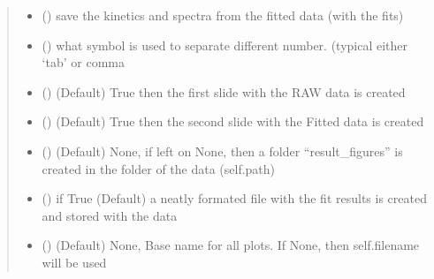 \documentclass[letterpaper,10pt,english]{sphinxmanual}
\begin{document}
\begin{fulllineitems}
\begin{fulllineitems}
\begin{quote}
\begin{description}
\begin{itemize}
\item {} 
 (\sphinxstyleliteralemphasis{\sphinxupquote{, }}) \textendash{} save the kinetics and spectra from the fitted data (with the fits)

\item {} 
 (\sphinxstyleliteralemphasis{\sphinxupquote{, }}) \textendash{} what symbol is used to separate different number. (typical either ‘tab’ or comma

\item {} 
 (\sphinxstyleliteralemphasis{\sphinxupquote{, }}) \textendash{} (Default) True then the first slide with the RAW data is created

\item {} 
 (\sphinxstyleliteralemphasis{\sphinxupquote{, }}) \textendash{} (Default) True then the second slide with the Fitted data is created

\item {} 
 (\sphinxstyleliteralemphasis{\sphinxupquote{, }}\sphinxstyleliteralemphasis{\sphinxupquote{, }}) \textendash{} (Default) None, if left on None, then a folder “result\_figures” is created in the folder
of the data (self.path)

\item {} 
 (\sphinxstyleliteralemphasis{\sphinxupquote{, }}) \textendash{} if True (Default)  a neatly formated file with the fit results is created and stored with the data

\item {} 
 (\sphinxstyleliteralemphasis{\sphinxupquote{, }}) \textendash{} (Default) None, Base name for all plots. If None, then self.filename will be used


\end{itemize}
\end{description}
\end{quote}
\end{fulllineitems}
\end{fulllineitems}
\end{document}
